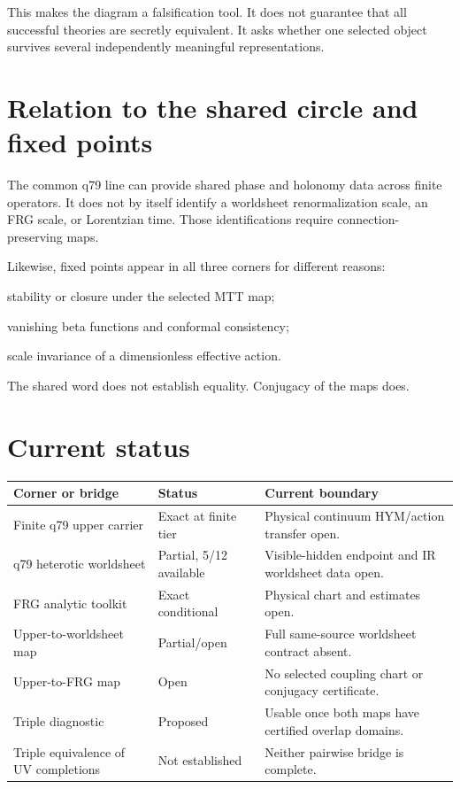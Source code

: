 \documentclass[11pt]{article}
\begin{document}
This makes the diagram a falsification tool. It does not guarantee that all
successful theories are secretly equivalent. It asks whether one selected
object survives several independently meaningful representations.

\section{Relation to the shared circle and fixed points}

The common q79 line can provide shared phase and holonomy data across finite
operators. It does not by itself identify a worldsheet renormalization scale,
an FRG scale, or Lorentzian time. Those identifications require
connection-preserving maps.

Likewise, fixed points appear in all three corners for different reasons:
\begin{description}[leftmargin=2.8cm,style=nextline]
\item[Upper fixed point] stability or closure under the selected MTT map;
\item[Worldsheet fixed point] vanishing beta functions and conformal
consistency;
\item[FRG fixed point] scale invariance of a dimensionless effective action.
\end{description}
The shared word does not establish equality. Conjugacy of the maps does.

\section{Current status}

\begin{center}
\begin{tabularx}{\textwidth}{@{}
>{\raggedright\arraybackslash}p{}
>{\raggedright\arraybackslash}p{}
>{\raggedright\arraybackslash}X@{}}
\toprule
Corner or bridge & Status & Current boundary\\
\midrule
Finite q79 upper carrier & Exact at finite tier &
Physical continuum HYM/action transfer open.\\
q79 heterotic worldsheet & Partial, 5/12 available &
Visible-hidden endpoint and IR worldsheet data open.\\
FRG analytic toolkit & Exact conditional &
Physical chart and estimates open.\\
Upper-to-worldsheet map & Partial/open &
Full same-source worldsheet contract absent.\\
Upper-to-FRG map & Open &
No selected coupling chart or conjugacy certificate.\\
Triple diagnostic & Proposed &
Usable once both maps have certified overlap domains.\\
Triple equivalence of UV completions & Not established &
Neither pairwise bridge is complete.\\
\bottomrule
\end{tabularx}
\end{center}
\end{document}
